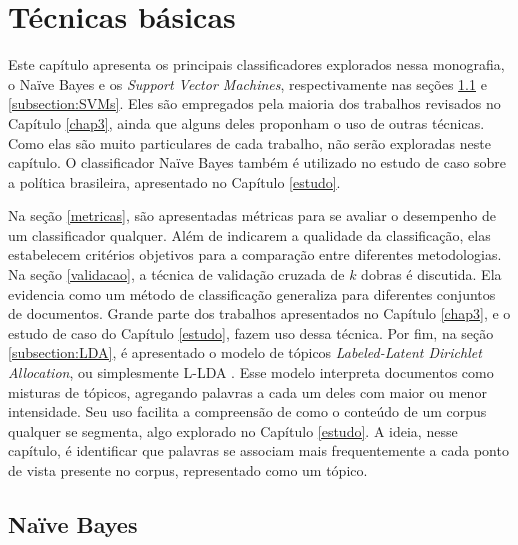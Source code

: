 \chapter{Técnicas básicas}
\label{basicos}

Este capítulo apresenta os principais classificadores explorados nessa monografia, o Naïve Bayes e os \emph{Support Vector Machines}, respectivamente nas seções \ref{subsection:naive} e \ref{subsection:SVMs}. Eles são empregados pela maioria dos trabalhos revisados no Capítulo \ref{chap3}, ainda que alguns deles proponham o uso de outras técnicas. Como elas são muito particulares de cada trabalho, não serão exploradas neste capítulo. O classificador Naïve Bayes também é utilizado no estudo de caso sobre a política brasileira, apresentado no Capítulo \ref{estudo}. 


Na seção \ref{metricas}, são apresentadas métricas para se avaliar o desempenho de um classificador qualquer. Além de indicarem a qualidade da classificação, elas estabelecem critérios objetivos para a comparação entre diferentes metodologias. Na seção \ref{validacao}, a técnica de validação cruzada de \ensuremath{k} dobras é discutida. Ela evidencia como um método de classificação generaliza para diferentes conjuntos de documentos. Grande parte dos trabalhos apresentados no Capítulo \ref{chap3}, e o estudo de caso do Capítulo \ref{estudo}, fazem uso dessa técnica. Por fim, na seção \ref{subsection:LDA}, é apresentado o modelo de tópicos \emph{Labeled-Latent Dirichlet Allocation}, ou simplesmente L-LDA \cite{llda}. Esse modelo interpreta documentos como misturas de tópicos, agregando palavras a cada um deles com maior ou menor intensidade. Seu uso facilita a compreensão de como o conteúdo de um corpus qualquer se segmenta, algo explorado no Capítulo \ref{estudo}. A ideia, nesse capítulo, é identificar que palavras se associam mais frequentemente a cada ponto de vista presente no corpus, representado como um tópico. 


\section{Naïve Bayes}
\label{subsection:naive}

